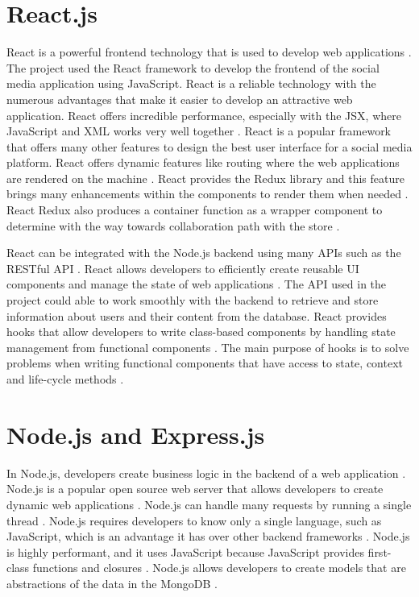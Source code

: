  \section{React.js}
 React is a powerful frontend technology that is used to develop web applications \cite{rawat2020reactjs}. The project used the React framework to develop the frontend of the social media application using JavaScript. React is a reliable technology with the numerous advantages that make it easier to develop an attractive web application. React offers incredible performance, especially with the JSX, where JavaScript and XML works very well together \cite{rawat2020reactjs}. React is a popular framework that offers many other features to design the best user interface for a social media platform. React offers dynamic features like routing where the web applications are rendered on the machine \cite{rawat2020reactjs}. React provides the Redux library and this feature brings many enhancements within the components to render them when needed \cite{rawat2020reactjs}. React Redux also produces a container function as a wrapper component to determine with the way towards collaboration path with the store \cite{rawat2020reactjs}.

 React can be integrated with the Node.js backend using many APIs such as the RESTful API \cite{ishaq2023design}. React allows developers to efficiently create reusable UI components and manage the state of web applications \cite{ishaq2023design}. The API used in the project could 
 able to work smoothly with the backend to retrieve and store information about users and their content from the database. React provides hooks that allow developers to write class-based components by handling state management from functional components \cite{aryal2020mern}. The main purpose of hooks is to solve problems when writing functional components that have access to state, context and life-cycle methods \cite{aryal2020mern}.

\section{Node.js and Express.js}
In Node.js, developers create business logic in the backend of a web application \cite{shah2017node}. Node.js is a popular open source web server that allows developers to create dynamic web applications \cite{aryal2020mern}. Node.js can handle many requests by running a single thread \cite{shah2017node}. Node.js requires developers to know only a single language, such as JavaScript, which is an advantage it has over other backend frameworks \cite{shah2017node}. Node.js is highly  performant, and it uses JavaScript because JavaScript provides first-class functions and closures \cite{syed2014beginning}. Node.js allows developers to create models that are abstractions of the data in the MongoDB \cite{ishaq2023design}. 

